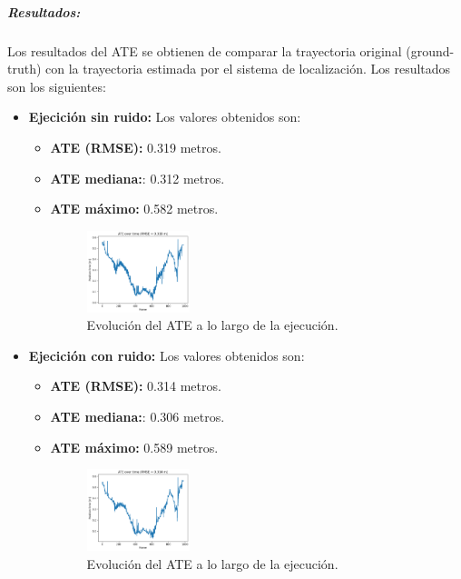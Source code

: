 \documentclass[12pt, a4paper, twoside]{article}
\begin{document}
\subparagraph{Resultados:}
Los resultados del ATE\cite{Chen2022DELOATE} se obtienen de comparar la trayectoria original (ground-truth) con la trayectoria estimada por el sistema de localización. 
Los resultados son los siguientes:
\begin{itemize}
  \item \textbf{Ejecición sin ruido:} Los valores obtenidos son:
  \begin{itemize}
    \item \textbf{ATE\cite{Chen2022DELOATE} (RMSE):} 0.319 metros.
    \item \textbf{ATE\cite{Chen2022DELOATE} mediana:}: 0.312 metros.
    \item \textbf{ATE\cite{Chen2022DELOATE} máximo:} 0.582 metros.
    \begin{figure}[h]
      \centering
        \includegraphics[width=0.3\textwidth]{ate_clean.png}
      \caption{Evolución del ATE\cite{Chen2022DELOATE} a lo largo de la ejecución.}
    \end{figure} 
  \end{itemize}
  \item \textbf{Ejecición con ruido:} Los valores obtenidos son:
  \begin{itemize}
    \item \textbf{ATE\cite{Chen2022DELOATE} (RMSE):} 0.314 metros.
    \item \textbf{ATE\cite{Chen2022DELOATE} mediana:}: 0.306 metros.
    \item \textbf{ATE\cite{Chen2022DELOATE} máximo:} 0.589 metros.
    \begin{figure}[h]
      \centering
        \includegraphics[width=0.3\textwidth]{ate_noisy.png}
      \caption{Evolución del ATE\cite{Chen2022DELOATE} a lo largo de la ejecución.}
    \end{figure} 
  \end{itemize}
\end{itemize}
\end{document}
